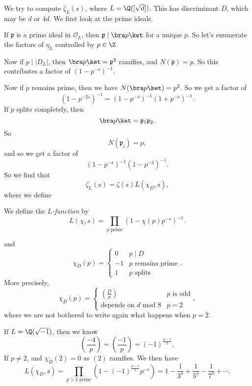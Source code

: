 \documentclass[a4paper]{article}
\begin{document}
\begin{eg}
  We try to compute $\zeta_L(s)$, where $L = \Q([\sqrt{d}])$. This has discriminant $D$, which may be $d$ or $4d$. We first look at the prime ideals.

  If $\mathfrak{p}$ is a prime ideal in $\mathcal{O}_L$, then $\mathfrak{p} \mid \bra p\ket$ for a unique $p$. So let's enumerate the factors of $\eta_L$ controlled by $p \in \Z$.

  Now if $p \mid |D_L|$, then $\bra p\ket = \mathfrak{p}^2$ ramifies, and $N(\mathfrak{p}) = p$. So this contributes a factor of $(1 - p^{-s})^{-1}$.

  Now if $p$ remains prime, then we have $N(\bra p\ket) = p^2$. So we get a factor of
  \[
    (1 - p^{-2s})^{-1} = (1 - p^{-s})^{-1} (1 + p^{-s})^{-1}.
  \]
  If $p$ splits completely, then
  \[
    \bra p\ket = \mathfrak{p}_1 \mathfrak{p}_2.
  \]
  So \[
    N(\mathfrak{p}_i) = p,
  \]
  and so we get a factor of
  \[
    (1 - p^{-s})^{-1}(1 - p^{-2})^{-1}.
  \]
  So we find that
  \[
    \zeta_L(s) = \zeta(s) L(\chi_D, s),
  \]
  where we define
  \begin{defi}[$L$-function]
    We define the \emph{$L$-function} by
    \[
      L(\chi, s) = \prod_{p\text{ prime}} (1 - \chi(p)p^{-s})^{-1}.
    \]
  \end{defi}
  and
  \[
    \chi_D(p) =
    \begin{cases}
      0 & p \mid D\\
      -1 & p\text{ remains prime}\\
      1 & p\text{ splits}
    \end{cases}.
  \]
  More precisely,
  \[
    \chi_D(p) =
    \begin{cases}
      \left(\frac{D}{p}\right) & p\text{ is odd}\\
      \text{depends on }d \text{ mod } 8 & p = 2
    \end{cases},
  \]
  where we are not bothered to write again what happens when $p = 2$.
\end{eg}

\begin{eg}
  If $L = \Q(\sqrt{-1})$, then we know
  \[
    \left(\frac{-4}{p}\right) = \left(\frac{-1}{p}\right) = (-1)^{\frac{p - 1}{2}},
  \]
  If $p \not= 2$, and $\chi_D(2) = 0$ as $(2)$ ramifies. We then have
  \[
    L(\chi_D, s) = \prod_{p > 2\text{ prime}} (1 - (-1)^{\frac{p - 1}{2}}p^{-s}) = 1 - \frac{1}{3^s} + \frac{1}{5^s} - \frac{1}{7^s} + \cdots.
  \]
\end{eg}
\end{document}
